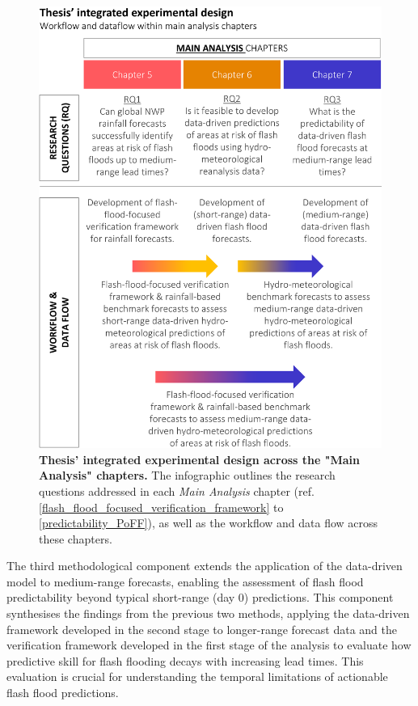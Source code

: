 \begin{figure}[htbp]
\centering
\includegraphics[width=\textwidth]{workflow_dataflow.png}
\caption{\textbf{Thesis' integrated experimental design across the "Main Analysis" chapters.} The infographic outlines the research questions addressed in each \textit{Main Analysis} chapter (ref. \ref{flash_flood_focused_verification_framework} to \ref{predictability_PoFF}), as well as the workflow and data flow across these chapters.}
\label{fig:workflow_dataflow}
\end{figure}

The  third methodological component extends the application of the data-driven model to medium-range forecasts, enabling the assessment of flash flood predictability beyond typical short-range (day 0) predictions. This component synthesises the findings from the previous two methods, applying the data-driven framework developed in the second stage to longer-range forecast data and the verification framework developed in the first stage of the analysis to evaluate how predictive skill for flash flooding decays with increasing lead times. This evaluation is crucial for understanding the temporal limitations of actionable flash flood predictions.



